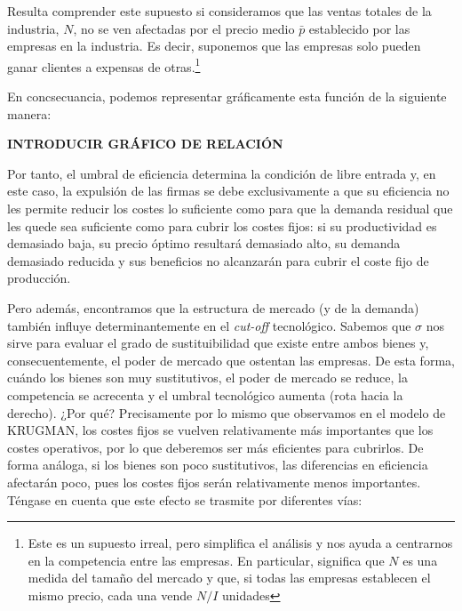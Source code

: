 \documentclass[10pt,a4paper]{article}
\begin{document}
Resulta comprender este supuesto si consideramos que las ventas totales de la industria, $N$, no se ven afectadas por el precio medio $\bar p$ establecido por las empresas en la industria. Es decir, suponemos que las empresas solo pueden ganar clientes a expensas de otras.\footnote{%
    Este es un supuesto irreal, pero simplifica el análisis y nos ayuda a centrarnos en la competencia entre las empresas. En particular, significa que $N$ es una medida del tamaño del mercado y que, si todas las empresas establecen el mismo precio, cada una vende $N/I$ unidades
}





En concsecuancia, podemos representar gráficamente esta función de la siguiente manera:

\textbf{INTRODUCIR GRÁFICO DE RELACIÓN}

Por tanto, el umbral de eficiencia determina la condición de libre entrada y, en este caso, la expulsión de las firmas se debe exclusivamente a que su eficiencia no les permite reducir los costes lo suficiente como para que la demanda residual que les quede sea suficiente como para cubrir los costes fijos: si su productividad es demasiado baja, su precio óptimo resultará demasiado alto, su demanda demasiado reducida y sus beneficios no alcanzarán para cubrir el coste fijo de producción. 

Pero además, encontramos que la estructura de mercado (y de la demanda) también influye determinantemente en el \textit{cut-off} tecnológico. Sabemos que $\sigma$ nos sirve para evaluar el grado de sustituibilidad que existe entre ambos bienes y, consecuentemente, el poder de mercado que ostentan las empresas. De esta forma, cuándo los bienes son muy sustitutivos, el poder de mercado se reduce, la competencia se acrecenta y el umbral tecnológico aumenta (rota hacia la derecho). ¿Por qué? Precisamente por lo mismo que observamos en el modelo de KRUGMAN, los costes fijos se vuelven relativamente más importantes que los costes operativos, por lo que deberemos ser más eficientes para cubrirlos. De forma análoga, si los bienes son poco sustitutivos, las diferencias en eficiencia afectarán poco, pues los costes fijos serán relativamente menos importantes. Téngase en cuenta que este efecto se trasmite por diferentes vías:
\end{document}
